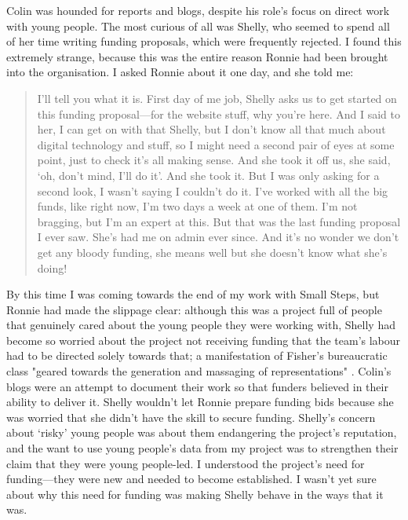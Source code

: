 Colin was hounded for reports and blogs, despite his role's focus on direct work with young people. The most curious of all was Shelly, who seemed to spend all of her time writing funding proposals, which were frequently rejected. I found this extremely strange, because this was the entire reason Ronnie had been brought into the organisation. I asked Ronnie about it one day, and she told me:
\begin{quote}
I'll tell you what it is. First day of me job, Shelly asks us to get started on this funding proposal—for the website stuff, why you're here. And I said to her, I can get on with that Shelly, but I don't know all that much about digital technology and stuff, so I might need a second pair of eyes at some point, just to check it's all making sense. And she took it off us, she said, `oh, don't mind, I'll do it'. And she took it. But I was only asking for a second look, I wasn't saying I couldn't do it. I've worked with all the big funds, like right now, I'm two days a week at one of them. I'm not bragging, but I'm an expert at this. But that was the last funding proposal I ever saw. She's had me on admin ever since. And it's no wonder we don't get any bloody funding, she means well but she doesn't know what she's doing!
\end{quote}

By this time I was coming towards the end of my work with Small Steps, but Ronnie had made the slippage clear: although this was a project full of people that genuinely cared about the young people they were working with, Shelly had become so worried about the project not receiving funding that the team's labour had to be directed solely towards that; a manifestation of Fisher's bureaucratic class "geared towards the generation and massaging of representations" \citep[p. 46]{fisher_capitalist_2009}. Colin's blogs were an attempt to document their work so that funders believed in their ability to deliver it. Shelly wouldn't let Ronnie prepare funding bids because she was worried that she didn't have the skill to secure funding. Shelly's concern about `risky' young people was about them endangering the project's reputation, and the want to use young people's data from my project was to strengthen their claim that they were young people-led. I understood the project's need for funding—they were new and needed to become established. I wasn't yet sure about why this need for funding was making Shelly behave in the ways that it was.


